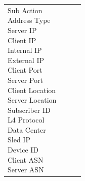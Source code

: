 \begin{description}
\begin{longtable}{p{}|p{}|p{}|p{}}
{                                                                                                            Sub Action\\
                                                                                                            Address Type\\
                                                                                                            Server IP\\
                                                                                                            Client IP\\
                                                                                                            Internal IP\\
                                                                                                            External IP\\
                                                                                                            Client Port\\
                                                                                                            Server Port\\
                                                                                                            Client Location\\
                                                                                                            Server Location\\
                                                                                                            Subscriber ID\\
                                                                                                            L4 Protocol\\
                                                                                                            Data Center\\
                                                                                                            Sled IP\\
                                                                                                            Device ID\\
                                                                                                            Client ASN\\
                                                                                                            Server ASN\\
}
\end{longtable}
\end{description}
